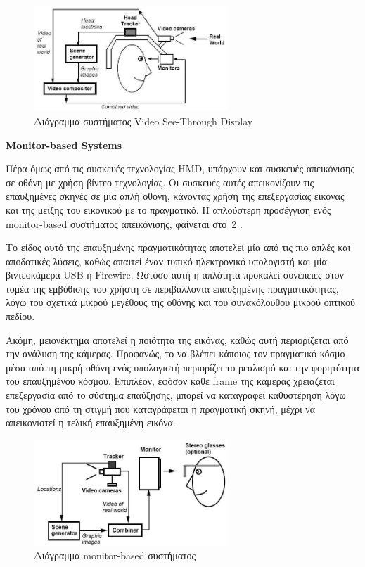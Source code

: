 \begin{figure}[H]
    \centering
    \includegraphics[width=0.65\textwidth]{Files/Figures/videoseethrough.jpg}
    \caption[Διάγραμμα συστήματος Video See-Through Display]{ Διάγραμμα συστήματος Video See-Through Display \cite{azuma1997}}
    \label{fig:videoseethrough}
\end{figure}


\textbf{Monitor-based Systems}


Πέρα όμως από τις συσκευές τεχνολογίας HMD, υπάρχουν και συσκευές απεικόνισης σε οθόνη με χρήση βίντεο-τεχνολογίας. Οι συσκευές αυτές απεικονίζουν τις επαυξημένες σκηνές σε μία απλή οθόνη, κάνοντας χρήση της επεξεργασίας εικόνας και της μείξης του εικονικού με το πραγματικό. Η απλούστερη προσέγγιση ενός monitor-based συστήματος απεικόνισης, φαίνεται στο~\ref{fig:monitor} .


Το είδος αυτό της επαυξημένης πραγματικότητας αποτελεί μία από τις πιο απλές και αποδοτικές λύσεις, καθώς απαιτεί έναν τυπικό ηλεκτρονικό υπολογιστή και μία βιντεοκάμερα USB ή Firewire. Ωστόσο αυτή η απλότητα προκαλεί συνέπειες στον τομέα της εμβύθισης του χρήστη σε περιβάλλοντα επαυξημένης πραγματικότητας, λόγω του σχετικά μικρού μεγέθους της οθόνης και του συνακόλουθου μικρού οπτικού πεδίου.


Ακόμη, μειονέκτημα αποτελεί η ποιότητα της εικόνας, καθώς αυτή περιορίζεται από την ανάλυση της κάμερας. Προφανώς, το να βλέπει κάποιος τον πραγματικό κόσμο μέσα από τη μικρή οθόνη ενός υπολογιστή περιορίζει το ρεαλισμό και την φορητότητα του επαυξημένου κόσμου. Επιπλέον, εφόσον κάθε frame της κάμερας χρειάζεται επεξεργασία από το σύστημα επαύξησης, μπορεί να καταγραφεί καθυστέρηση λόγω του χρόνου από τη στιγμή που καταγράφεται η πραγματική σκηνή, μέχρι να απεικονιστεί η τελική επαυξημένη εικόνα. 




\begin{figure}[H]
    \centering
    \includegraphics[width=0.65\textwidth]{Files/Figures/monitor.jpg}
    \caption[Διάγραμμα Monitor-based συστήματος ]{ Διάγραμμα monitor-based συστήματος \cite{azuma1997}}
    \label{fig:monitor}
\end{figure}


